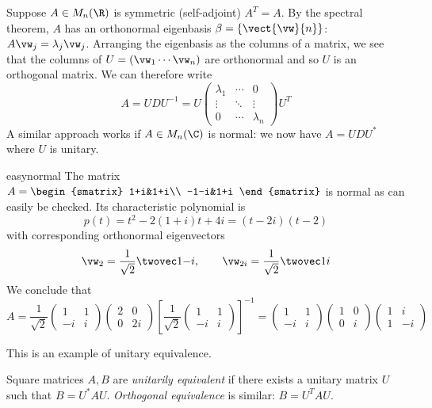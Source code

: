 Suppose $A\in M_n(\R)$ is symmetric (self-adjoint) $A^T=A$. By the spectral theorem, $A$ has an orthonormal eigenbasis $\beta=\{\vect{\vw}{n}\}$: $A\vw_j=\lambda_j\vw_j$. Arranging the eigenbasis as the columns of a matrix, we see that the columns of $U=(\vw_1\cdots \vw_n)$ are orthonormal and so $U$ is an orthogonal matrix. We can therefore write
\[A=UDU^{-1}=U\begin{pmatrix}
\lambda_1&\cdots&0\\
\vdots&\ddots&\vdots\\
0&\cdots&\lambda_n
\end{pmatrix}U^T\]
A similar approach works if $A\in M_n(\C)$ is normal: we now have $A=UDU^*$ where $U$ is unitary.

\begin{example}{}{easynormal}
The matrix $A=\begin{smatrix}
1+i&1+i\\
-1-i&1+i
\end{smatrix}$ is normal as can easily be checked. Its characteristic polynomial is
\[p(t)=t^2-2(1+i)t+4i=(t-2i)(t-2)\]
with corresponding orthonormal eigenvectors
\[\vw_2=\frac 1{\sqrt 2}\twovec 1{-i},\qquad \vw_{2i}=\frac 1{\sqrt 2}\twovec 1i\]
We conclude that
\[A=\frac 1{\sqrt 2}\begin{pmatrix}
1&1\\
-i&i
\end{pmatrix}
\begin{pmatrix}
2&0\\
0&2i
\end{pmatrix}
\left[\frac 1{\sqrt 2}\begin{pmatrix}
1&1\\
-i&i
\end{pmatrix}\right]^{-1}
=\begin{pmatrix}
1&1\\
-i&i
\end{pmatrix}
\begin{pmatrix}
1&0\\
0&i
\end{pmatrix}
\begin{pmatrix}
1&i\\
1&-i
\end{pmatrix}\]
\end{example}

This is an example of unitary equivalence.

\begin{defn}{}{}
Square matrices $A,B$ are \emph{unitarily equivalent} if there exists a unitary matrix $U$ such that $B=U^*AU$. \emph{Orthogonal equivalence} is similar: $B=U^TAU$.
\end{defn}

